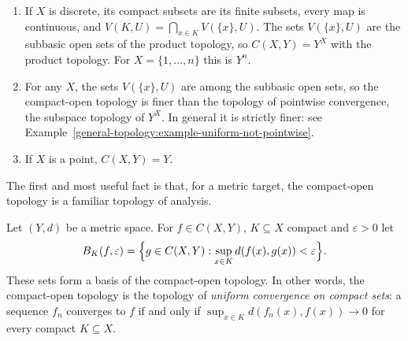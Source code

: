 \begin{example}\label{general-topology:example-compact-open}
\begin{enumerate}
\item If $X$ is discrete, its compact subsets are its finite subsets, every map is continuous, and $V(K, U) = \bigcap_{x \in K}V(\{x\}, U)$. The sets $V(\{x\}, U)$ are the subbasic open sets of the
product topology, so $C(X, Y) = Y^X$ with the product topology. For $X = \{1, \ldots, n\}$ this is $Y^n$.
\item For any $X$, the sets $V(\{x\}, U)$ are among the subbasic open sets, so the compact-open topology is finer than the topology of pointwise convergence, the subspace topology of $Y^X$. In
general it is strictly finer: see Example~\ref{general-topology:example-uniform-not-pointwise}.
\item If $X$ is a point, $C(X, Y) = Y$.
\end{enumerate}
\end{example}

The first and most useful fact is that, for a metric target, the compact-open topology is a familiar topology of analysis.

\begin{proposition}\label{general-topology:proposition-compact-open-metric}
Let $(Y, d)$ be a metric space. For $f \in C(X, Y)$, $K \subseteq X$ compact and $\varepsilon > 0$ let
\[
B_K(f, \varepsilon) = \Bigl\{g \in C(X, Y) : \sup_{x \in K}d(f(x), g(x)) < \varepsilon\Bigr\}.
\]
These sets form a basis of the compact-open topology. In other words, the compact-open topology is the topology of \emph{uniform convergence on compact sets}: a sequence $f_n$ converges to
$f$ if and only if $\sup_{x \in K}d(f_n(x), f(x)) \to 0$ for every compact $K \subseteq X$.
\end{proposition}

